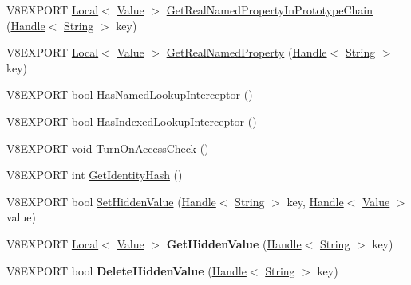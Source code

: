\begin{DoxyCompactItemize}
\item 
V8\+E\+X\+P\+O\+R\+T \hyperlink{classv8_1_1_local}{Local}$<$ \hyperlink{classv8_1_1_value}{Value} $>$ \hyperlink{classv8_1_1_object_ab955e6c94dc6bf3e65e5355eb3d2d876}{Get\+Real\+Named\+Property\+In\+Prototype\+Chain} (\hyperlink{classv8_1_1_handle}{Handle}$<$ \hyperlink{classv8_1_1_string}{String} $>$ key)
\item 
V8\+E\+X\+P\+O\+R\+T \hyperlink{classv8_1_1_local}{Local}$<$ \hyperlink{classv8_1_1_value}{Value} $>$ \hyperlink{classv8_1_1_object_a353c1568c4de35ef3f3065b5a4aecc50}{Get\+Real\+Named\+Property} (\hyperlink{classv8_1_1_handle}{Handle}$<$ \hyperlink{classv8_1_1_string}{String} $>$ key)
\item 
V8\+E\+X\+P\+O\+R\+T bool \hyperlink{classv8_1_1_object_ad0791109068a7816d65a06bbc9f6f870}{Has\+Named\+Lookup\+Interceptor} ()
\item 
V8\+E\+X\+P\+O\+R\+T bool \hyperlink{classv8_1_1_object_afd36ea440a254335bde065a4ceafffb3}{Has\+Indexed\+Lookup\+Interceptor} ()
\item 
V8\+E\+X\+P\+O\+R\+T void \hyperlink{classv8_1_1_object_aa2299eda3240be1e76b7d5c2af7a6bbc}{Turn\+On\+Access\+Check} ()
\item 
V8\+E\+X\+P\+O\+R\+T int \hyperlink{classv8_1_1_object_a5309f7a349feb906a05ee45b6feeaab1}{Get\+Identity\+Hash} ()
\item 
V8\+E\+X\+P\+O\+R\+T bool \hyperlink{classv8_1_1_object_a0040e3012d621b25f580407bacebf95f}{Set\+Hidden\+Value} (\hyperlink{classv8_1_1_handle}{Handle}$<$ \hyperlink{classv8_1_1_string}{String} $>$ key, \hyperlink{classv8_1_1_handle}{Handle}$<$ \hyperlink{classv8_1_1_value}{Value} $>$ value)
\item 
\hypertarget{classv8_1_1_object_af3634e494683aee31ea57ca493cc016a}{}V8\+E\+X\+P\+O\+R\+T \hyperlink{classv8_1_1_local}{Local}$<$ \hyperlink{classv8_1_1_value}{Value} $>$ {\bfseries Get\+Hidden\+Value} (\hyperlink{classv8_1_1_handle}{Handle}$<$ \hyperlink{classv8_1_1_string}{String} $>$ key)\label{classv8_1_1_object_af3634e494683aee31ea57ca493cc016a}

\item 
\hypertarget{classv8_1_1_object_ac88c826e949768226fc88a812110038c}{}V8\+E\+X\+P\+O\+R\+T bool {\bfseries Delete\+Hidden\+Value} (\hyperlink{classv8_1_1_handle}{Handle}$<$ \hyperlink{classv8_1_1_string}{String} $>$ key)\label{classv8_1_1_object_ac88c826e949768226fc88a812110038c}


\end{DoxyCompactItemize}
